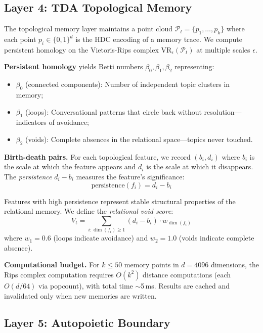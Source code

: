 \documentclass[10pt,twocolumn]{article}
\begin{document}
\subsection{Layer 4: TDA Topological Memory}

The topological memory layer maintains a point cloud $\mathcal{P}_t = \{p_1, \ldots, p_k\}$ where each point $p_i \in \{0,1\}^d$ is the HDC encoding of a memory trace. We compute persistent homology on the Vietoris-Rips complex $\text{VR}_\epsilon(\mathcal{P}_t)$ at multiple scales $\epsilon$.

\textbf{Persistent homology} yields Betti numbers $\beta_0, \beta_1, \beta_2$ representing:
\begin{itemize}[nosep,leftmargin=*]
\item $\beta_0$ (connected components): Number of independent topic clusters in memory;
\item $\beta_1$ (loops): Conversational patterns that circle back without resolution---indicators of avoidance;
\item $\beta_2$ (voids): Complete absences in the relational space---topics never touched.
\end{itemize}

\textbf{Birth-death pairs.} For each topological feature, we record $(b_i, d_i)$ where $b_i$ is the scale at which the feature appears and $d_i$ is the scale at which it disappears. The \emph{persistence} $d_i - b_i$ measures the feature's significance:
\begin{equation}
\text{persistence}(f_i) = d_i - b_i
\label{eq:persistence}
\end{equation}

Features with high persistence represent stable structural properties of the relational memory. We define the \emph{relational void score}:
\begin{equation}
V_t = \sum_{i: \dim(f_i) \geq 1} (d_i - b_i) \cdot w_{\dim(f_i)}
\label{eq:void_score}
\end{equation}
where $w_1 = 0.6$ (loops indicate avoidance) and $w_2 = 1.0$ (voids indicate complete absence).

\textbf{Computational budget.} For $k \leq 50$ memory points in $d=4096$ dimensions, the Rips complex computation requires $O(k^2)$ distance computations (each $O(d/64)$ via popcount), with total time $\sim$5\,ms. Results are cached and invalidated only when new memories are written.

\subsection{Layer 5: Autopoietic Boundary}
\end{document}
